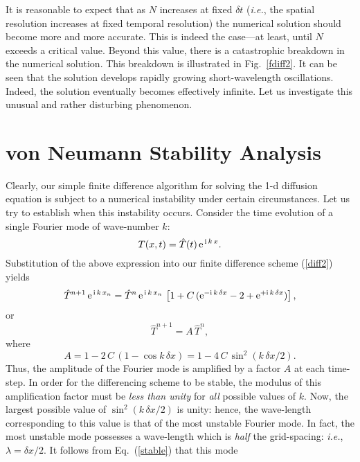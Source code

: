 It is reasonable to expect that as $N$ increases at fixed $\delta t$
({\em i.e.}, the spatial resolution increases at fixed temporal resolution) the numerical
solution should become more and more accurate. This is indeed the case---at least, until $N$ 
exceeds a critical value. Beyond this value, there is a
catastrophic breakdown in the numerical solution. This breakdown is illustrated in Fig.~\ref{fdiff2}. 
It can be seen that the
solution develops rapidly growing short-wavelength oscillations. Indeed, the solution
eventually becomes effectively infinite. Let us investigate this unusual
and rather disturbing phenomenon.

\section{von Neumann Stability Analysis}
Clearly, our simple finite difference algorithm 
for solving the 1-d diffusion equation is subject to a numerical instability under certain circumstances.
Let us try to establish when this instability occurs. Consider the time evolution
of a single Fourier mode of wave-number $k$: 
\begin{equation}
T(x,t) = \hat{T}(t)\,{\rm e}^{\,{\rm i}\,k\,x}.
\end{equation}
Substitution of the above expression into our finite difference scheme (\ref{diff2}) yields
\begin{equation}
\hat{T}^{n+1}\,{\rm e}^{\,{\rm i}\,k\,x_n} = \hat{T}^n\,{\rm e}^{\,{\rm i}\,k\,x_n}\,
\left[1 + C\,({\rm e}^{-{\rm i}\,k\,\delta x}-2+ {\rm e}^{+{\rm i}\,k\,\delta x})\right],
\end{equation}
or
\begin{equation}
\hat{T}^{n+1} = A\,\hat{T}^n,
\end{equation}
where 
\begin{equation}\label{stable}
A = 1 - 2\,C\,(1-\cos k\,\delta x) = 1 - 4\,C\,\sin^2(k\,\delta x/2).
\end{equation}
Thus, the amplitude of the Fourier mode is amplified by a factor $A$ at each time-step.
In order for the differencing scheme to be stable, the
modulus of this amplification
factor must be {\em less than unity}  for {\em all} possible values of $k$. Now, the largest
possible value of $\sin^2(k\,\delta x/2)$ is unity: hence, the wave-length corresponding to
this value is that of the most unstable Fourier mode. In fact, the most unstable mode
possesses a wave-length which is {\em half} the grid-spacing: {\em i.e.},
$\lambda = \delta x/2$. It follows from Eq.~(\ref{stable}) that this mode
